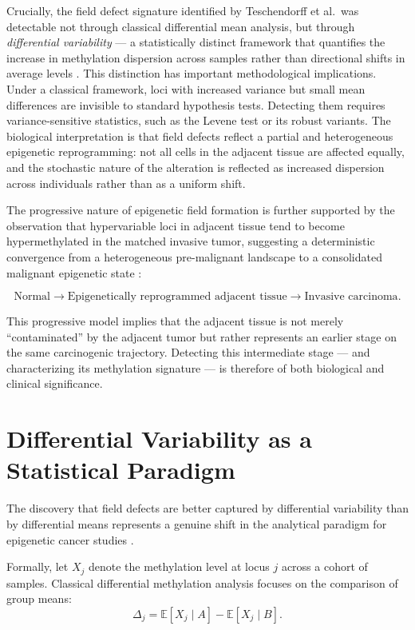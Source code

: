 Crucially, the field defect signature identified by Teschendorff et al.\ was
detectable not through classical differential mean analysis, but through
\textit{differential variability} — a statistically distinct framework that
quantifies the increase in methylation dispersion across samples rather than
directional shifts in average levels \cite{Teschendorff2016,Teschendorff2014}.
This distinction has important methodological implications. Under a classical
framework, loci with increased variance but small mean differences are invisible
to standard hypothesis tests. Detecting them requires variance-sensitive statistics,
such as the Levene test or its robust variants. The biological interpretation is
that field defects reflect a partial and heterogeneous epigenetic reprogramming:
not all cells in the adjacent tissue are affected equally, and the stochastic
nature of the alteration is reflected as increased dispersion across individuals
rather than as a uniform shift.

The progressive nature of epigenetic field formation is further supported by
the observation that hypervariable loci in adjacent tissue tend to become
hypermethylated in the matched invasive tumor, suggesting a deterministic
convergence from a heterogeneous pre-malignant landscape to a consolidated
malignant epigenetic state \cite{Teschendorff2016}:

\[
\text{Normal} \rightarrow
\text{Epigenetically reprogrammed adjacent tissue} \rightarrow
\text{Invasive carcinoma}.
\]

This progressive model implies that the adjacent tissue is not merely
``contaminated'' by the adjacent tumor but rather represents an earlier stage
on the same carcinogenic trajectory. Detecting this intermediate stage — and
characterizing its methylation signature — is therefore of both biological
and clinical significance.

\section{Differential Variability as a Statistical Paradigm}

The discovery that field defects are better captured by differential variability
than by differential means represents a genuine shift in the analytical paradigm
for epigenetic cancer studies \cite{Teschendorff2014}.

Formally, let $X_j$ denote the methylation level at locus $j$ across a cohort
of samples. Classical differential methylation analysis focuses on the comparison
of group means:
\[
\Delta_j = \mathbb{E}[X_j \mid A] - \mathbb{E}[X_j \mid B].
\]


